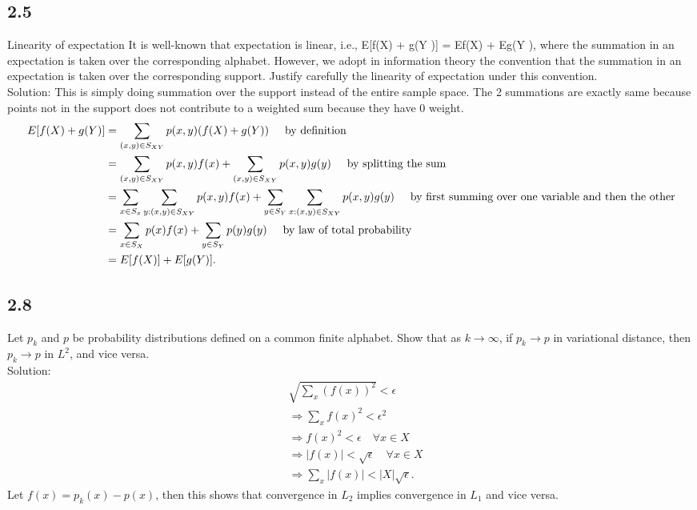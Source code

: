 \documentclass[../main.tex]{subfiles}
\begin{document}
\subsection*{2.5}
Linearity of expectation It is well-known that expectation is linear,
i.e., E[f(X) + g(Y )] = Ef(X) + Eg(Y ), where the summation in an
expectation is taken over the corresponding alphabet. However, we
adopt in information theory the convention that the summation in an
expectation is taken over the corresponding support. Justify carefully
the linearity of expectation under this convention.\\
Solution: This is simply doing summation over the support instead of the entire sample space. The 2 summations are exactly same because points not in the support does not contribute to a weighted sum because they have 0 weight.
\begin{align*}
E[f(X) + g(Y)] &= \sum_{(x,y) \in S_{XY}} p(x, y)(f(X) + g(Y)) \hspace{5mm}\text{by definition}\\
&= \sum_{(x,y) \in S_{XY}} p(x, y)f(x) + \sum_{(x,y) \in S_{XY}} p(x, y)g(y) \hspace{5mm}\text{by splitting the sum}\\
&= \sum_{x \in S_x} \sum_{y : (x,y) \in S_{XY}} p(x, y)f(x) + \sum_{y \in S_Y} \sum_{x : (x,y) \in S_{XY}} p(x, y)g(y) \hspace{5mm}\text{by first summing over one variable and then the other}\\
&= \sum_{x \in S_X} p(x)f(x) + \sum_{y \in S_Y} p(y)g(y) \hspace{5mm}\text{by law of total probability}\\
&= E[f(X)] + E[g(Y)].
\end{align*}
\subsection*{2.8}Let \( p_k \) and \( p \) be probability distributions defined on a common finite alphabet. Show that as \( k \to \infty \), if \( p_k \to p \) in variational distance, then \( p_k \to p \) in \( L^2 \), and vice versa.\\
Solution: \begin{align*}
&\sqrt{\sum_{x} (f(x))^2} < \epsilon \\
&\Rightarrow \sum_{x} f(x)^2 < \epsilon^2 \\
&\Rightarrow f(x)^2 < \epsilon \quad \forall x \in X \\
&\Rightarrow |f(x)| < \sqrt{\epsilon} \quad \forall x \in X \\
&\Rightarrow \sum_{x} |f(x)| < |X| \sqrt{\epsilon}.
\end{align*}
Let $f(x)=p_k(x)-p(x)$, then this shows that convergence in $L_2$ implies convergence in $L_1$ and vice versa. 
\end{document}
